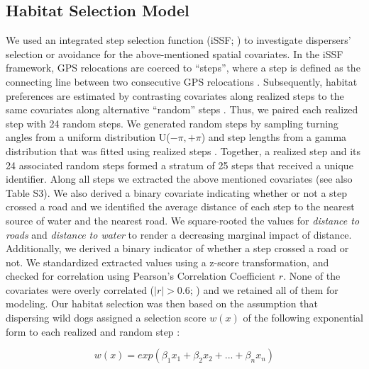 \documentclass[abstract=on,10pt,a4paper,bibliography=totocnumbered]{article}
\begin{document}
\subsection{Habitat Selection Model}
We used an integrated step selection function (iSSF; \citealp{Avgar.2016}) to
investigate dispersers' selection or avoidance for the above-mentioned spatial
covariates. In the iSSF framework, GPS relocations are coerced to  ``steps'',
where a step is defined as the connecting line between two consecutive GPS
relocations \citep{Turchin.1998}. Subsequently, habitat preferences are
estimated by contrasting covariates along realized steps to the same covariates
along alternative ``random''  steps \citep{Fortin.2005, Thurfjell.2014,
Avgar.2016}. Thus, we paired each realized step with 24 random steps. We
generated random steps by sampling turning angles from a uniform distribution
U(\(-\pi, +\pi\)) and step lengths from a gamma distribution that was fitted
using realized steps \citep{Avgar.2016}. Together, a realized step and its 24
associated random steps formed a stratum of 25 steps that received a unique
identifier. Along all steps we extracted the above mentioned covariates (see
also Table S3). We also derived a binary covariate indicating whether or not a
step crossed a road and we identified the average distance of each step to the
nearest source of water and the nearest road. We square-rooted the values for
\textit{distance to roads} and \textit{distance to water} to render a decreasing
marginal impact of distance. Additionally, we derived a binary indicator of
whether a step crossed a road or not. We standardized extracted values using a
z-score transformation, and checked for correlation using Pearson's Correlation
Coefficient \(r\). None of the covariates were overly correlated (\(|r| > 0.6\);
\citealp{Latham.2011}) and we retained all of them for modeling. Our habitat
selection was then based on the assumption that dispersing wild dogs assigned a
selection score \(w(x)\) of the following exponential form to each realized and
random step \citep{Fortin.2005, Thurfjell.2014, Avgar.2016}:

\begin{equation}
\label{EQ1}
  w(x) = exp(\beta_1 x_1 + \beta_2 x_2 + ... + \beta_n x_n)
\end{equation}
\end{document}
